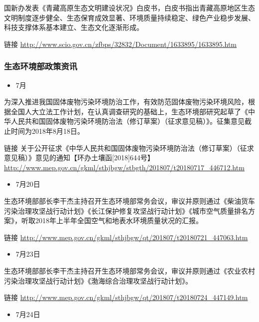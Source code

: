 \documentclass[
]{book}
\providecommand{\tightlist}{%
  \setlength{\itemsep}{0pt}\setlength{\parskip}{0pt}}
\begin{document}
国新办发表《青藏高原生态文明建设状况》白皮书，白皮书指出青藏高原地区生态文明制度逐步健全、生态保育成效显著、环境质量持续稳定、绿色产业稳步发展、科技支撑体系基本建立、生态文化逐渐形成。

链接 \url{http://www.scio.gov.cn/zfbps/32832/Document/1633895/1633895.htm}

\hypertarget{ux751fux6001ux73afux5883ux90e8ux653fux7b56ux8d44ux8baf-3}{%
\subsubsection*{生态环境部政策资讯}\label{ux751fux6001ux73afux5883ux90e8ux653fux7b56ux8d44ux8baf-3}}

\begin{itemize}
\tightlist
\item
  7月
\end{itemize}

为深入推进我国固体废物污染环境防治工作，有效防范固体废物污染环境风险，根据全国人大立法工作计划，在认真调查研究的基础上，生态环境部研究起草了《中华人民共和国固体废物污染环境防治法（修订草案）（征求意见稿）》。征集意见截止时间为2018年8月18日。

链接 关于公开征求《中华人民共和国固体废物污染环境防治法（修订草案）（征求意见稿）》意见的通知【环办土壤函{[}2018{]}644号】\url{http://www.mep.gov.cn/gkml/sthjbgw/stbgth/201807/t20180717_446712.htm}

\begin{itemize}
\tightlist
\item
  7月20日
\end{itemize}

生态环境部部长李干杰主持召开生态环境部常务会议，审议并原则通过《柴油货车污染治理攻坚战行动计划》《长江保护修复攻坚战行动计划》《城市空气质量排名方案》，听取2018年上半年全国空气和地表水环境质量状况的汇报。

链接 \url{http://www.mep.gov.cn/gkml/sthjbgw/qt/201807/t20180721_447063.htm}

\begin{itemize}
\tightlist
\item
  7月23日
\end{itemize}

生态环境部部长李干杰主持召开生态环境部常务会议，审议并原则通过《农业农村污染治理攻坚战行动计划》《渤海综合治理攻坚战行动计划》。

链接 \url{http://www.mep.gov.cn/gkml/sthjbgw/qt/201807/t20180724_447149.htm}

\begin{itemize}
\tightlist
\item
  7月24日
\end{itemize}
\end{document}
